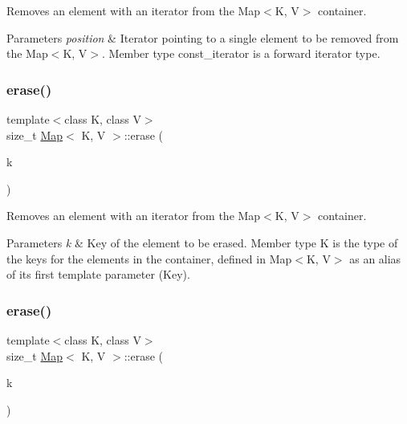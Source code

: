 Removes an element with an iterator from the Map$<$\+K, V$>$ container.


\begin{DoxyParams}{Parameters}
{\em position} & Iterator pointing to a single element to be removed from the Map$<$\+K, V$>$. Member type const\+\_\+iterator is a forward iterator type. \\
\hline
\end{DoxyParams}
\mbox{\label{classMap_afcbe7e6aac0b0dbad94bb1cacb4d023d}} 
\subsubsection{\texorpdfstring{erase()}{erase()}\hspace{0.1cm}{\footnotesize\ttfamily [3/6]}}
{\footnotesize\ttfamily template$<$class K, class V$>$ \\
size\+\_\+t \hyperlink{classMap}{Map}$<$ K, V $>$\+::erase (\begin{DoxyParamCaption}\item[{const K \&}]{k }\end{DoxyParamCaption})\hspace{0.3cm}{\ttfamily [inline]}}

Removes an element with an iterator from the Map$<$\+K, V$>$ container.


\begin{DoxyParams}{Parameters}
{\em k} & Key of the element to be erased. Member type \textquotesingle{}K\textquotesingle{} is the type of the keys for the elements in the container, defined in Map$<$\+K, V$>$ as an alias of its first template parameter (Key). \\
\hline
\end{DoxyParams}
\mbox{\label{classMap_afcbe7e6aac0b0dbad94bb1cacb4d023d}} 
\subsubsection{\texorpdfstring{erase()}{erase()}\hspace{0.1cm}{\footnotesize\ttfamily [4/6]}}
{\footnotesize\ttfamily template$<$class K, class V$>$ \\
size\+\_\+t \hyperlink{classMap}{Map}$<$ K, V $>$\+::erase (\begin{DoxyParamCaption}\item[{const K \&}]{k }\end{DoxyParamCaption})\hspace{0.3cm}{\ttfamily [inline]}}

